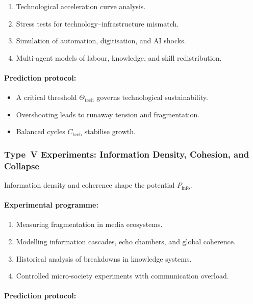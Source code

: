 \begin{enumerate}
    \item Technological acceleration curve analysis.
    \item Stress tests for technology–infrastructure mismatch.
    \item Simulation of automation, digitisation, and AI shocks.
    \item Multi-agent models of labour, knowledge, and skill redistribution.
\end{enumerate}

\paragraph{Prediction protocol:}

\begin{itemize}
    \item A critical threshold $\Theta_{\mathrm{tech}}$ governs technological sustainability.
    \item Overshooting leads to runaway tension and fragmentation.
    \item Balanced cycles $C_{\mathrm{tech}}$ stabilise growth.
\end{itemize}



\subsubsection{Type~V Experiments: Information Density, Cohesion, and Collapse}

Information density and coherence shape the potential $P_{\mathrm{info}}$.

\paragraph{Experimental programme:}

\begin{enumerate}
    \item Measuring fragmentation in media ecosystems.
    \item Modelling information cascades, echo chambers, and global coherence.
    \item Historical analysis of breakdowns in knowledge systems.
    \item Controlled micro-society experiments with communication overload.
\end{enumerate}

\paragraph{Prediction protocol:}

